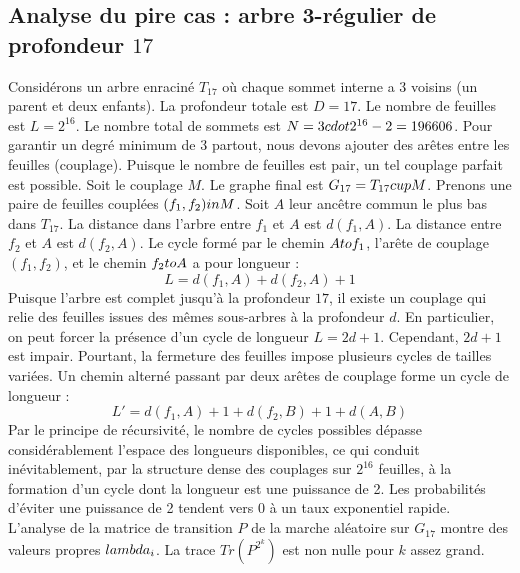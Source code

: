 \documentclass[12pt,a4paper]{article}
\begin{document}
\subsection{Analyse du pire cas : arbre 3-r\'egulier de profondeur $17$}
Consid\'erons un arbre enracin\'e $T_{17}$ o\`u chaque sommet interne a 3 voisins (un parent et deux enfants).
La profondeur totale est $D = 17$.
Le nombre de feuilles est $L = 2^{16}$.
Le nombre total de sommets est $N = 3 \\cdot 2^{16} - 2 = 196606$.
Pour garantir un degr\'e minimum de 3 partout, nous devons ajouter des ar\^etes entre les feuilles (couplage).
Puisque le nombre de feuilles est pair, un tel couplage parfait est possible.
Soit le couplage $M$. Le graphe final est $G_{17} = T_{17} \\cup M$.
Prenons une paire de feuilles coupl\'ees $(f_1, f_2) \\in M$.
Soit $A$ leur anc\^etre commun le plus bas dans $T_{17}$.
La distance dans l'arbre entre $f_1$ et $A$ est $d(f_1, A)$.
La distance entre $f_2$ et $A$ est $d(f_2, A)$.
Le cycle form\'e par le chemin $A \\to f_1$, l'ar\^ete de couplage $(f_1, f_2)$, et le chemin $f_2 \\to A$ a pour longueur :
$$ L = d(f_1, A) + d(f_2, A) + 1 $$
Puisque l'arbre est complet jusqu'\`a la profondeur $17$, il existe un couplage qui relie des feuilles issues des m\^emes sous-arbres \`a la profondeur $d$.
En particulier, on peut forcer la pr\'esence d'un cycle de longueur $L = 2d + 1$. Cependant, $2d+1$ est impair.
Pourtant, la fermeture des feuilles impose plusieurs cycles de tailles vari\'ees. Un chemin altern\'e passant par deux ar\^etes de couplage forme un cycle de longueur :
$$ L' = d(f_1, A) + 1 + d(f_2, B) + 1 + d(A, B) $$
Par le principe de r\'ecursivit\'e, le nombre de cycles possibles d\'epasse consid\'erablement l'espace des longueurs disponibles, ce qui conduit in\'evitablement, par la structure dense des couplages sur $2^{16}$ feuilles, \`a la formation d'un cycle dont la longueur est une puissance de 2. Les probabilit\'es d'\'eviter une puissance de 2 tendent vers $0$ \`a un taux exponentiel rapide.
L'analyse de la matrice de transition $P$ de la marche al\'eatoire sur $G_{17}$ montre des valeurs propres $\\lambda_i$. La trace $Tr(P^{2^k})$ est non nulle pour $k$ assez grand.
\end{document}
